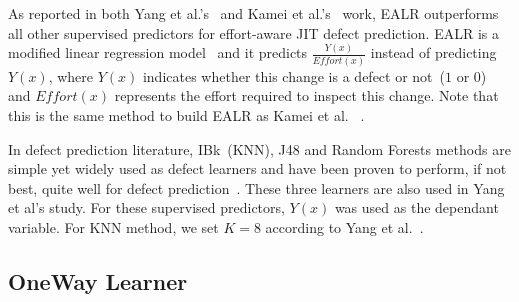 \documentclass[sigconf]{acmart}
\theoremstyle{break}
\newcommand{\wei}[1]{\textcolor{red}{Wei: #1}}
\newcommand{\bi}{\begin{itemize}[leftmargin=0.4cm]}
\newcommand{\ei}{\end{itemize}}
\begin{document}
As reported in both Yang et al.'s~\cite{yang2016effort}
and Kamei et al.'s~\cite{kamei2013large} work, EALR outperforms
all other supervised predictors for effort-aware JIT defect prediction.
EALR is a modified linear regression model~\cite{kamei2013large} and it predicts $\mathit{\frac{Y(x)}{Effort(x)}}$ instead of predicting $Y(x)$,
 where $Y(x)$ indicates whether this change
is a defect or not~($1$ or $0$) and $\mathit{Effort(x)}$ represents the effort required 
to inspect this change. Note that this is the same method to 
build EALR as Kamei et al. ~\cite{kamei2013large}.



In defect prediction literature, IBk~(KNN), J48 and Random Forests methods are simple yet widely used  as defect learners and have been proven to perform, if not best, quite
well for defect prediction~\cite{lessmann2008benchmarking,menzies2007data,hall2012systematic,turhan2009relative}. These three
learners are also used in Yang et al's study. For these
supervised predictors, $Y(x)$ was used as the dependant variable. 
For KNN method, we set $K=8$ according to Yang et al.~\cite{yang2016effort}.


\subsection{OneWay Learner}\label{OneWay}




\end{document}
